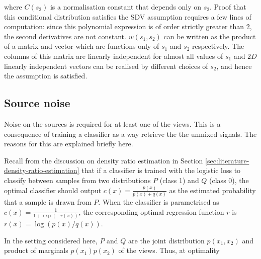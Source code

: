 where $C(s_2)$ is a normalisation constant that depends only on $s_2$.
Proof that this conditional distribution satisfies the SDV assumption requires a few lines of computation:
since this polynomial expression is of order strictly greater than 2, the second derivatives are not constant.
${w}(s_1, s_2)$ can be written as the product of a matrix and vector which are functions only of $s_1$ and $s_2$ respectively.
The columns of this matrix are linearly independent for almost all values of $s_1$ and $2D$ linearly independent vectors can be realised by different choices of $s_2$, and hence the assumption is satisfied.


\subsection{Source noise}\label{sec:converged}

Noise on the sources is required for at least one of the views. 
This is a consequence of training a classifier as a way retrieve the the unmixed signals.
The reasons for this are explained briefly here.

Recall from the discussion on density ratio estimation in Section \ref{sec:literature-density-ratio-estimation} that if a classifier is trained with the logistic loss to classify between samples from two distributions $P$ (class 1) and $Q$ (class 0), the optimal classifier should output $c(x) = \frac{p(x)}{p(x) + q(x)}$ as the estimated probability that a sample is drawn from $P$.
When the classifier is parametrised as $c(x) = \frac{1}{1 + \exp(-r(x))}$, the corresponding optimal regression function $r$ is $r(x) = \log( p(x) / q(x))$. 

In the setting considered here, $P$ and $Q$ are the joint distribution $p(x_1, x_2)$ and product of marginals $p(x_1)p(x_2)$ of the views.
Thus, at optimality



